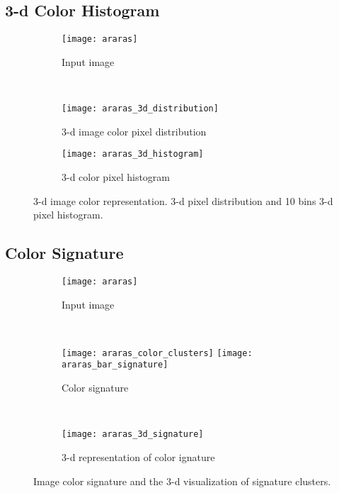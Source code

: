     
\subsection{3-d Color Histogram}

\begin{figure}[!ht]
    \centering
    \begin{subfigure}[b]{0.4\textwidth}
        \texttt{[image: araras]}
        \caption{Input image}
    \end{subfigure} \\
       
    \begin{subfigure}[b]{0.49\textwidth}
        \texttt{[image: araras\_3d\_distribution]}
        \caption{3-d image color pixel distribution}
    \end{subfigure} 
    \begin{subfigure}[b]{0.49\textwidth}
        \texttt{[image: araras\_3d\_histogram]}
        \caption{3-d color pixel histogram}
    \end{subfigure} 
    
    \caption{3-d image color representation. 3-d pixel distribution and 10 bins 3-d pixel histogram.}\label{fig:3d_color_representation}    
\end{figure}


\subsection{Color Signature}

\begin{figure}[!ht]
    \centering
    \begin{subfigure}[b]{0.4\textwidth}
        \texttt{[image: araras]}
        \caption{Input image}
    \end{subfigure} \\
    
    \begin{subfigure}[b]{0.4\textwidth}
    	\texttt{[image: araras\_color\_clusters]}
        \texttt{[image: araras\_bar\_signature]}
        \caption{Color signature}
    \end{subfigure}
    	~ %
    \begin{subfigure}[b]{0.5\textwidth}
        \texttt{[image: araras\_3d\_signature]}
        \caption{3-d representation of color ignature}
    \end{subfigure} 
    	    
    \caption{Image color signature and the 3-d visualization of signature clusters.}\label{fig:color_signature}    
\end{figure}



